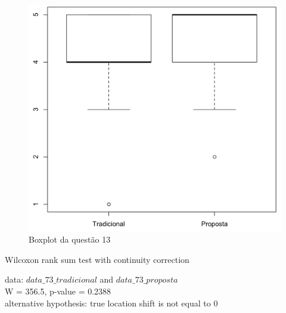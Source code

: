 \begin{figure}[htb]
  \caption{\label{fig:questao13-boxplot}Boxplot da questão 13}
  \begin{center}
      \includegraphics[scale=0.6]{./Figuras/questao13-boxplot.png}
  \end{center}
\end{figure}

Wilcoxon rank sum test with continuity correction

data:  $data\_73\_tradicional$ and $data\_73\_proposta$\\
W = 356.5, p-value = 0.2388\\
alternative hypothesis: true location shift is not equal to 0
